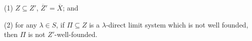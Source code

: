 (1) $Z \subseteq Z'$, $\overline{Z}' = \overline{X}$; and

(2) for any $\lambda \in S$, if $\Pi \subseteq Z$ is a $\lambda$-direct limit system which is not well founded, then $\Pi$ is not $Z'$-well-founded.
